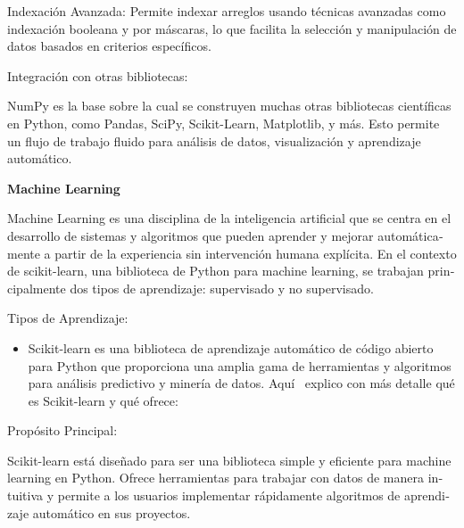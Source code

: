 \documentclass[letterpaper]{article}
\newcommand\textstyleListLabelxix[1]{\textrm{\textbf{#1}}}
\begin{document}
{
\foreignlanguage{spanish}{Indexación Avanzada: Permite indexar arreglos usando técnicas avanzadas como indexación
booleana y por máscaras, lo que facilita la selección y manipulación de datos basados en criterios específicos.}}

{
\foreignlanguage{spanish}{Integración con otras bibliotecas:}}

{
\foreignlanguage{spanish}{NumPy es la base sobre la cual se construyen muchas otras bibliotecas científicas en Python,
como Pandas, SciPy, Scikit-Learn, Matplotlib, y más. Esto permite un flujo de trabajo fluido para análisis de datos,
visualización y aprendizaje automático.}}


\bigskip


\bigskip


\bigskip

{
\foreignlanguage{spanish}{\textbf{Machine Learning }}}

{
\foreignlanguage{spanish}{Machine Learning es una disciplina de la inteligencia artificial que se centra en el
desarrollo de sistemas y algoritmos que pueden aprender y mejorar automáticamente a partir de la experiencia sin
intervención humana explícita. En el contexto de scikit-learn, una biblioteca de Python para machine learning, se
trabajan principalmente dos tipos de aprendizaje: supervisado y no supervisado.}}

{
\foreignlanguage{spanish}{Tipos de Aprendizaje:}}

\begin{itemize}[series=listWWNumiii,label=\textstyleListLabelxix{{}-}]
\item {
\foreignlanguage{spanish}{Scikit-learn es una biblioteca de aprendizaje automático de código abierto para Python que
proporciona una amplia gama de herramientas y algoritmos para análisis predictivo y minería de datos. Aquí \ explico
con más detalle qué es Scikit-learn y qué ofrece:}}
\end{itemize}

\bigskip

{
\foreignlanguage{spanish}{Propósito Principal:}}

{
\foreignlanguage{spanish}{Scikit-learn está diseñado para ser una biblioteca simple y eficiente para machine learning en
Python. Ofrece herramientas para trabajar con datos de manera intuitiva y permite a los usuarios implementar
rápidamente algoritmos de aprendizaje automático en sus proyectos.}}
\end{document}
